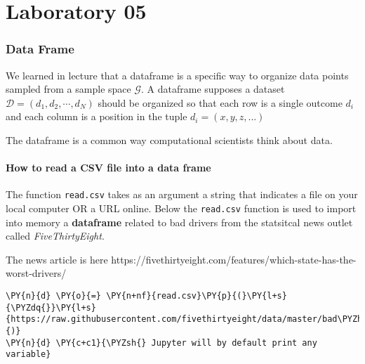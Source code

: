 \chapter{Laboratory 05}

\hypertarget{data-frame}{%
\subsection{Data Frame}\label{data-frame}}

We learned in lecture that a dataframe is a specific way to organize
data points sampled from a sample space \(\mathcal{G}\). A dataframe
supposes a dataset \(\mathcal{D} = ( d_{1},d_{2},\cdots,d_{N})\) should
be organized so that each row is a single outcome \(d_{i}\) and each
column is a position in the tuple \(d_{i} = ( x,y,z,... )\)

The dataframe is a common way computational scientists think about data.

    \hypertarget{how-to-read-a-csv-file-into-a-data-frame}{%
\subsubsection{How to read a CSV file into a data
frame}\label{how-to-read-a-csv-file-into-a-data-frame}}

The function \texttt{read.csv} takes as an argument a string that
indicates a file on your local computer OR a URL online. Below the
\texttt{read.csv} function is used to import into memory a
\textbf{dataframe} related to bad drivers from the statsitcal news
outlet called \emph{FiveThirtyEight}.

The news article is here
https://fivethirtyeight.com/features/which-state-has-the-worst-drivers/

    \begin{tcolorbox}[breakable, size=fbox, boxrule=1pt, pad at break*=1mm,colback=cellbackground, colframe=cellborder]
\begin{Verbatim}[commandchars=\\\{\}]
\PY{n}{d} \PY{o}{=} \PY{n+nf}{read.csv}\PY{p}{(}\PY{l+s}{\PYZdq{}}\PY{l+s}{https://raw.githubusercontent.com/fivethirtyeight/data/master/bad\PYZhy{}drivers/bad\PYZhy{}drivers.csv\PYZdq{}}\PY{p}{)}
\PY{n}{d} \PY{c+c1}{\PYZsh{} Jupyter will by default print any variable}
\end{Verbatim}
\end{tcolorbox}

